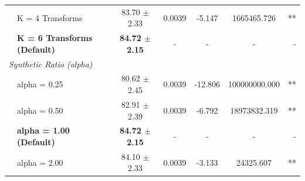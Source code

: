 \begin{table}[t]
\begin{tabular}{llccccr}
  & K = 4 Transforms & 83.70 $\pm$ 2.33 & 0.0039 & -5.147 & 1665465.726 & ** \\
  & \textbf{K = 6 Transforms (Default)} & \textbf{84.72 $\pm$ 2.15} & - & - & - & - \\
\midrule
\multicolumn{7}{l}{\textit{Synthetic Ratio (alpha)}} \\
  & alpha = 0.25 & 80.62 $\pm$ 2.45 & 0.0039 & -12.806 & 100000000.000 & ** \\
  & alpha = 0.50 & 82.91 $\pm$ 2.39 & 0.0039 & -6.792 & 18973832.319 & ** \\
  & \textbf{alpha = 1.00 (Default)} & \textbf{84.72 $\pm$ 2.15} & - & - & - & - \\
  & alpha = 2.00 & 84.10 $\pm$ 2.33 & 0.0039 & -3.133 & 24325.607 & ** \\
\bottomrule
\end{tabular}
\end{table}
